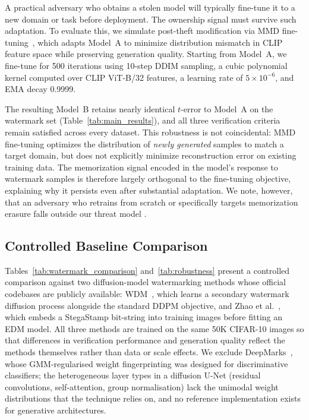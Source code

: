 \documentclass[sigconf, review, anonymous]{acmart}
\begin{document}
A practical adversary who obtains a stolen model will typically fine-tune it to a new domain or task before deployment. The ownership signal must survive such adaptation. To evaluate this, we simulate post-theft modification via MMD fine-tuning~\citep{gretton2012kernel}, which adapts Model~A to minimize distribution mismatch in CLIP feature space while preserving generation quality. Starting from Model~A, we fine-tune for 500 iterations using 10-step DDIM sampling, a cubic polynomial kernel computed over CLIP ViT-B/32 features, a learning rate of $5{\times}10^{-6}$, and EMA decay 0.9999.

The resulting Model~B retains nearly identical $t$-error to Model~A on the watermark set (Table~\ref{tab:main_results}), and all three verification criteria remain satisfied across every dataset. This robustness is not coincidental: MMD fine-tuning optimizes the distribution of \emph{newly generated} samples to match a target domain, but does not explicitly minimize reconstruction error on existing training data. The memorization signal encoded in the model's response to watermark samples is therefore largely orthogonal to the fine-tuning objective, explaining why it persists even after substantial adaptation. We note, however, that an adversary who retrains from scratch or specifically targets memorization erasure falls outside our threat model .

\subsection{Controlled Baseline Comparison}
\label{sec:baseline_comparison}

Tables~\ref{tab:watermark_comparison} and~\ref{tab:robustness} present
a controlled comparison against two diffusion-model watermarking
methods whose official codebases are publicly available:
WDM~\citep{peng2023watermark}, which learns a secondary watermark
diffusion process alongside the standard DDPM objective, and Zhao
et al.~\citep{zhao2023recipe}, which embeds a StegaStamp bit-string
into training images before fitting an EDM model.  All three methods
are trained on the same 50K CIFAR-10 images so that differences in
verification performance and generation quality reflect the methods
themselves rather than data or scale effects.  We exclude
DeepMarks~\citep{chen2019deepmarks}, whose GMM-regularised weight
fingerprinting was designed for discriminative classifiers; the
heterogeneous layer types in a diffusion U-Net (residual convolutions,
self-attention, group normalisation) lack the unimodal weight
distributions that the technique relies on, and no reference
implementation exists for generative architectures.
\end{document}
